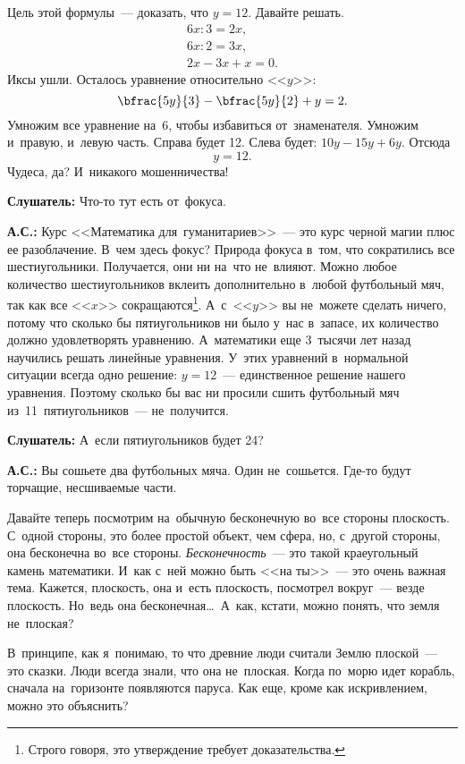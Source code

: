 Цель этой формулы~--- доказать, что $y=12$. Давайте решать.
\begin{gather*}
6x:3=2x,\\
6x:2=3x,\\
2x-3x+x=0.
\end{gather*}
Иксы ушли. Осталось уравнение относительно <<$y$>>:
$$
\bfrac{5y}{3}-\bfrac{5y}{2}+y=2.
$$
Умножим все уравнение на~6, чтобы избавиться от~знаменателя. Умножим и~правую, и~левую часть.
Справа будет 12.
Слева будет: $10y-15y+6y$. Отсюда
$$
y=12.
$$
Чудеса, да? И~никакого мошенничества!

\textbf{Слушатель:} Что-то тут есть от~фокуса.

\textbf{А.С.:} Курс <<Математика для~гуманитариев>>~--- это курс черной магии плюс ее разоблачение.
В~чем здесь фокус? Природа фокуса в~том, что сократились все шестиугольники. Получается, они ни
на~что не~влияют. Можно любое количество шестиугольников вклеить дополнительно в~любой футбольный
мяч, так как все <<$x$>> сокращаются\footnote{Строго говоря, это утверждение требует доказательства.}.
 А~с~<<$y$>> вы не~можете сделать ничего, потому что сколько бы
пятиугольников ни было у~нас в~запасе, их количество должно удовлетворять уравнению. А~математики
еще 3~тысячи лет назад научились решать линейные уравнения. У~этих уравнений в~нормальной ситуации
всегда одно решение: $y=12$~--- единственное решение нашего уравнения. Поэтому сколько бы вас ни
просили сшить футбольный мяч из~11~пятиугольников~--- не~получится.

\textbf{Слушатель:} А~если пятиугольников будет 24?

\textbf{А.С.:} Вы сошьете два футбольных мяча. Один не~сошьется. Где-то будут торчащие, несшиваемые части.


Давайте теперь посмотрим на~обычную бесконечную во~все стороны плоскость. С~одной стороны, это
более простой объект, чем сфера, но, с~другой стороны, она бесконечна во~все стороны.
\textit{Бесконечность}~--- это такой краеугольный камень математики. И~как с~ней можно быть <<на ты>>~--- это
очень важная тема. Кажется, плоскость, она и~есть плоскость, посмотрел вокруг~--- везде плоскость.
Но~ведь она бесконечная\ldots\ А~как, кстати, можно понять, что земля не~плоская?

В~принципе, как я~понимаю, то что древние люди считали Землю плоской~--- это сказки. Люди всегда
знали, что она не~плоская. Когда по~морю идет корабль, сначала на~горизонте появляются паруса. Как
еще, кроме как искривлением, можно это объяснить?

